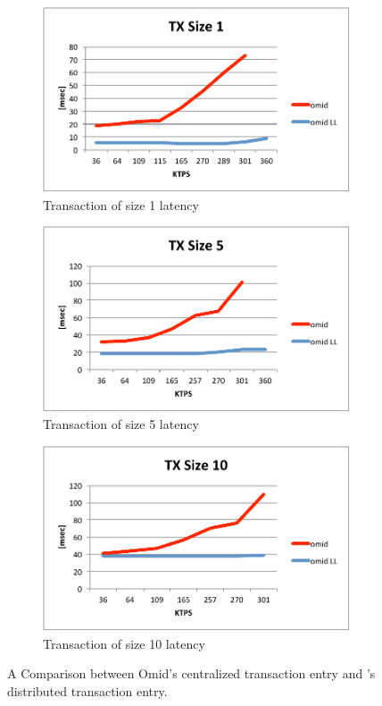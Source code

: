 \begin{figure}[!h]
  \centering
  \begin{subfigure}[t]{0.4\textwidth}
	\includegraphics[width=\textwidth]{figs/omdLL1.pdf}
	\caption[]{Transaction of size 1 latency}
    \label{fig:ll:tx1}
  \end{subfigure}
  \begin{subfigure}[t]{0.4\textwidth}
	\includegraphics[width=\textwidth]{figs/omdLL5.pdf}
	\caption[]{Transaction of size 5 latency}
    \label{fig:l:tx5}
  \end{subfigure}
    \begin{subfigure}[t]{0.4\textwidth}
	\includegraphics[width=\textwidth]{figs/omdLL10.pdf}
	\caption[]{Transaction of size 10 latency}
    \label{fig:l:tx10}
  \end{subfigure}			
  \caption{A Comparison between Omid's centralized transaction entry and \sys's distributed transaction entry.}
  \label{fig:ll}
\end{figure}

